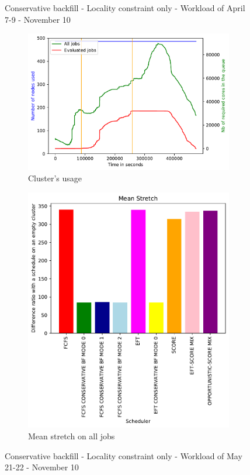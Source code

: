 \documentclass[a4paper]{article}
\begin{document}
\begin{figure}[H]
\caption{Conservative backfill - Locality constraint only - Workload of April 7-9 - November 10}\end{figure}

\begin{figure}[H]\centering
\begin{subfigure}[b]{0.4\linewidth}\centering\includegraphics[width=1\linewidth]{MBSS/plot/2022-05-21->2022-05-22_V9271_Fcfs_Used_nodes_450_128_32_256_4_1024.pdf}\caption{Cluster's usage}\end{subfigure}
\begin{subfigure}[b]{0.4\linewidth}\centering\includegraphics[width=0.9\linewidth]{MBSS/plot/Results_FCFS_Score_Backfill_2022-05-21->2022-05-22_V9271_Mean_Stretch_450_128_32_256_4_1024.pdf}\caption{Mean stretch on all jobs}\end{subfigure}
\caption{Conservative backfill - Locality constraint only - Workload of May 21-22 - November 10}\end{figure}
\end{document}
